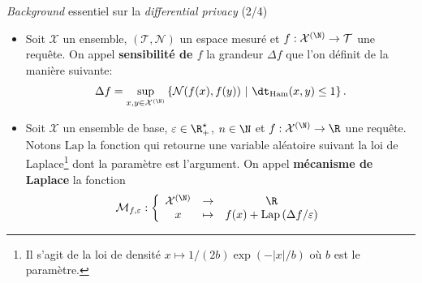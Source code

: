 \documentclass[10pt,serif]{beamer}
\begin{document}
  \begin{frame}{\textit{Background} essentiel sur la \textit{differential privacy} (2/4)}
    \begin{itemize}
      \item<1-> \begin{definition}
        Soit \(\mathcal X\) un ensemble, \((\mathcal T, \mathcal N)\) un espace mesuré et \(f : \mathcal X^{(\N)} \to \mathcal T\) une requête. On appel \textbf{sensibilité de \(f\)} la grandeur \(\Delta f\) que l'on définit de la manière suivante:
        \[
            \Delta f = \underset{x, y \in \mathcal X^{(\N)}}{\sup} \left\{ \mathcal N(f(x), f(y)) \ | \ \dt_{\text{Ham}}(x,y) \leq 1 \right\}. 
        \]
      \end{definition}

      \vspace{-0.5cm}
      \item<2-> \begin{definition}
        Soit \(\mathcal X\) un ensemble de base, \(\varepsilon \in \R_+^\star\), \(n \in \N\) et \(f : \mathcal X^{(\N)} \to \R\) une requête. Notons \(\text{Lap}\) la fonction qui retourne une variable aléatoire suivant la loi de {\sc Laplace}\footnote{Il s'agit de la loi de densité \(x \mapsto 1/(2b) \exp(-|x|/b)\) où \(b\) est le paramètre.} dont la paramètre est l'argument. On appel \textbf{mécanisme de {\sc Laplace}} la fonction 
        \[
            \mathcal M_{f,\varepsilon} : \left\{ 
                \begin{array}{ccc}
                    \mathcal X^{(\N)} & \to & \R\\
                    x & \mapsto & f(x) + \text{Lap}\left( {\Delta f}/{\varepsilon} \right)
                \end{array}
            \right.    
        \]
      \end{definition}
    \end{itemize}
  \end{frame}
\end{document}
